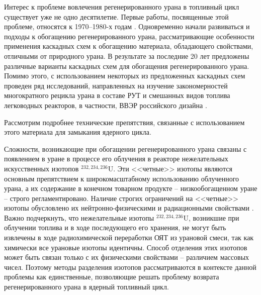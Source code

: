 Интерес к проблеме вовлечения регенерированного урана в топливный цикл существует уже не одно десятилетие. Первые работы, посвященные этой проблеме, относятся к 1970–1980-х годам \cite{kazukihidaSimultaneousEvaluationEffects1986,sidenkoIssledovanieKaskadnyhShem,psheninZaklyuchitelnyyOtchetNIR2012,delagarzaUranium236LightWater1977,raysIzgotovlenieOksidnogoTopliva1994,zhiroEkonomicheskiePreimushchestvaPererabotki1997,lebedevZamknutyyToplivnyyCikl1999}. Одновременно начали развиваться и подходы к обогащению регенерированного урана, рассматривающие особенности применения каскадных схем к обогащению материала, обладающего свойствами, отличными от природного урана. В результате за последние 20 лет предложены различные варианты каскадных схем для обогащения регенерированного урана. Помимо этого, с использованием некоторых из предложенных каскадных схем проведен ряд исследований, направленных на изучение закономерностей многократного рецикла урана в составе РУТ и смешанных видов топлива легководных реакторов, в частности, ВВЭР российского дизайна \cite{smirnovEvolutionIsotopicComposition2012,kazukihidaSimultaneousEvaluationEffects1986,blandinskiySoglasovannyyPodhodModelirovaniyu2018,colemanEvaluationMultipleSelfrecycling2010}. 

Рассмотрим подробнее технические препятствия, связанные с использованием этого материала для замыкания ядерного цикла.

Сложности, возникающие при обогащении регенерированного урана связаны с появлением в уране в процессе его облучения в реакторе нежелательных искусственных изотопов $^{232,234,236}$U. Эти <<четные>> изотопы являются основным препятствием к широкомасштабному использованию облученного урана, а их содержание в конечном товарном продукте -- низкообогащенном уране -- строго регламентировано.
Наличие строгих ограничений на <<четные>> изотопы обусловлено их нейтронно-физическими и радиационными свойствами \cite{smirnovEvolutionIsotopicComposition2012, proselkovAnalizVozmozhnostiIspolzovaniya2003, dudnikovInfluence236UEfficacy2016}.
Важно подчеркнуть, что нежелательные изотопы $^{232,234,236}$U, возникшие при облучении топлива и в ходе последующего его хранения, не могут быть извлечены в ходе радиохимической переработки ОЯТ из урановой смеси, так как химически все урановые изотопы идентичны. Способ отделения этих изотопов может быть связан только с их физическими свойствами -- различием массовых чисел. Поэтому методы разделения изотопов рассматриваются в контексте данной проблемы как единственные, позволяющие решать проблему возврата регенерированного урана в ядерный топливный цикл. 

